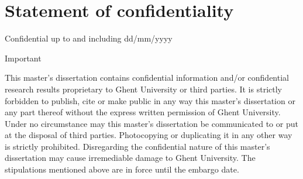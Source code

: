 \chapter*{Statement of confidentiality}

Confidential up to and including dd/mm/yyyy

Important

This master’s dissertation contains confidential information and/or confidential research results proprietary to Ghent University or third parties. It is strictly forbidden to publish, cite or make public in any way this master’s dissertation or any part thereof without the express written permission of Ghent University. Under no circumstance may this master’s dissertation be communicated to or put at the disposal of third parties. Photocopying or duplicating it in any other way is strictly prohibited. Disregarding the confidential nature of this master’s dissertation may cause irremediable damage to Ghent University. The stipulations mentioned above are in force until the embargo date.
%
%
%
